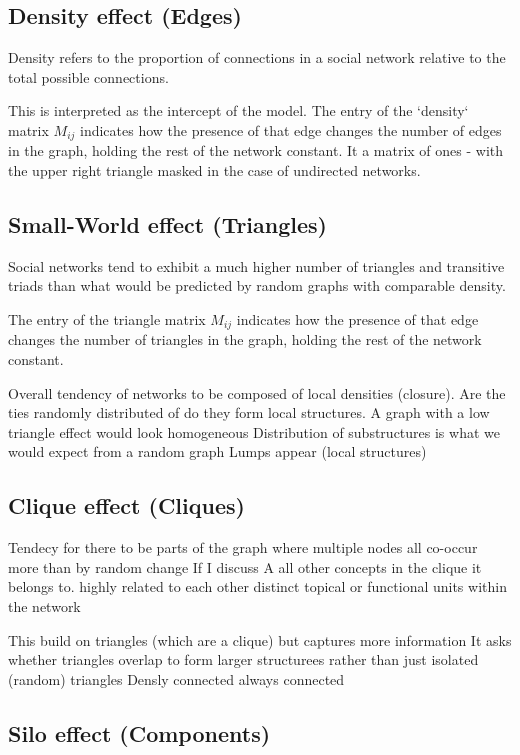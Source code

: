 

\subsection{Density effect (Edges)}

Density refers to the proportion of connections in a social network relative to the total possible
connections.

This is interpreted as the intercept of the model. The entry of the `density` matrix $M_{ij}$ 
indicates how the presence of that edge changes the number of edges in the graph, holding the 
rest of the network constant. It a matrix of ones - with the upper right triangle masked in the 
case of undirected networks.

\subsection{Small-World effect (Triangles)}

Social networks tend to exhibit a much higher number of triangles and transitive triads than what 
would be predicted by random graphs with comparable density.

The entry of the triangle matrix $M_{ij}$ indicates how the presence of that edge changes the 
number of triangles in the graph, holding the rest of the network constant. 

Overall tendency of networks to be composed of local densities (closure). Are the ties randomly 
distributed of do they form local structures.
A graph with a low triangle effect would look homogeneous 
Distribution of substructures is what we would expect from a random graph
Lumps appear (local structures)

\subsection{Clique effect (Cliques)}

Tendecy for there to be parts of the graph where multiple nodes all co-occur more than by random change
If I discuss A all other concepts in the clique it belongs to.
highly related to each other 
distinct topical or functional units within the network

This build on triangles (which are a clique) but captures more information 
It asks whether triangles overlap to form larger structurees rather than just isolated (random) triangles
Densly connected always connected

\subsection{Silo effect (Components)}

